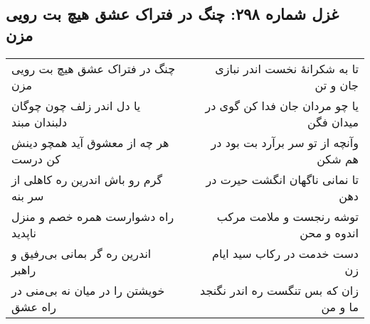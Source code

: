 \begin{center}
\section*{غزل شماره ۲۹۸: چنگ در فتراک عشق هیچ بت رویی مزن}
\label{sec:298}
\begin{longtable}{l p{0.5cm} r}
چنگ در فتراک عشق هیچ بت رویی مزن
&&
تا به شکرانهٔ نخست اندر نبازی جان و تن
\\
یا دل اندر زلف چون چوگان دلبندان مبند
&&
یا چو مردان جان فدا کن گوی در میدان فگن
\\
هر چه از معشوق آید همچو دینش کن درست
&&
وآنچه از تو سر برآرد بت بود در هم شکن
\\
گرم رو باش اندرین ره کاهلی از سر بنه
&&
تا نمانی ناگهان انگشت حیرت در دهن
\\
راه دشوارست همره خصم و منزل ناپدید
&&
توشه رنجست و ملامت مرکب اندوه و محن
\\
اندرین ره گر بمانی بی‌رفیق و راهبر
&&
دست خدمت در رکاب سید ایام زن
\\
خویشتن را در میان نه بی‌منی در راه عشق
&&
زان که بس تنگست ره اندر نگنجد ما و من
\\
\end{longtable}
\end{center}
